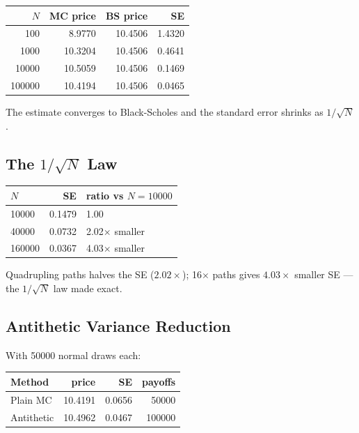 \begin{center}
\begin{tabular}{rrrr}
\toprule
$N$ & MC price & BS price & SE \\
\midrule
100 & 8.9770 & 10.4506 & 1.4320 \\
1000 & 10.3204 & 10.4506 & 0.4641 \\
10000 & 10.5059 & 10.4506 & 0.1469 \\
100000 & 10.4194 & 10.4506 & 0.0465 \\
\bottomrule
\end{tabular}
\end{center}

The estimate converges to Black-Scholes and the standard error shrinks as
$1/\sqrt{N}$.

\subsection{The $1/\sqrt{N}$ Law}

\begin{center}
\begin{tabular}{lrl}
\toprule
$N$ & SE & ratio vs $N=10000$ \\
\midrule
10000 & 0.1479 & 1.00 \\
40000 & 0.0732 & 2.02$\times$ smaller \\
160000 & 0.0367 & 4.03$\times$ smaller \\
\bottomrule
\end{tabular}
\end{center}

Quadrupling paths halves the SE ($2.02\times$); 16$\times$ paths gives
$4.03\times$ smaller SE --- the $1/\sqrt{N}$ law made exact.

\subsection{Antithetic Variance Reduction}

With 50000 normal draws each:

\begin{center}
\begin{tabular}{lrrr}
\toprule
Method & price & SE & payoffs \\
\midrule
Plain MC & 10.4191 & 0.0656 & 50000 \\
Antithetic & 10.4962 & 0.0467 & 100000 \\
\bottomrule
\end{tabular}
\end{center}

